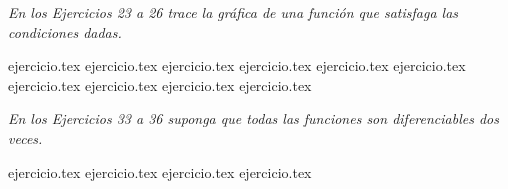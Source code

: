 \vspace{1em}
\noindent \textit{En los Ejercicios 23 a 26 trace la gráfica de una función que satisfaga las condiciones dadas.}

\begin{enumerate}
    \setcounter{enumi}{22}
    {ejercicio.tex}
    {ejercicio.tex}
    {ejercicio.tex}
    {ejercicio.tex}
    {ejercicio.tex}
    {ejercicio.tex}
    {ejercicio.tex}
    {ejercicio.tex}
    {ejercicio.tex}
    {ejercicio.tex}
\end{enumerate}

\vspace{1em}
\noindent \textit{En los Ejercicios 33 a 36 suponga que todas las funciones son diferenciables dos veces.}

\begin{enumerate}
    \setcounter{enumi}{32}
    {ejercicio.tex}
    {ejercicio.tex}
    {ejercicio.tex}
    {ejercicio.tex}
\end{enumerate}
